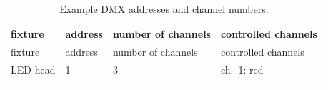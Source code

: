 \hypertarget{tbl:dmx-addresses}{}
\begin{longtable}[]{@{}llll@{}}
\caption[Example DMX addresses and channel
numbers]{\label{tbl:dmx-addresses}Example DMX addresses and channel
numbers. }\tabularnewline
\toprule
\begin{minipage}[b]{0.17\columnwidth}\raggedright\strut
fixture\strut
\end{minipage} & \begin{minipage}[b]{0.12\columnwidth}\raggedright\strut
address\strut
\end{minipage} & \begin{minipage}[b]{0.15\columnwidth}\raggedright\strut
number of channels\strut
\end{minipage} & \begin{minipage}[b]{0.28\columnwidth}\raggedright\strut
controlled channels\strut
\end{minipage}\tabularnewline
\midrule
\endfirsthead
\toprule
\begin{minipage}[b]{0.17\columnwidth}\raggedright\strut
fixture\strut
\end{minipage} & \begin{minipage}[b]{0.12\columnwidth}\raggedright\strut
address\strut
\end{minipage} & \begin{minipage}[b]{0.15\columnwidth}\raggedright\strut
number of channels\strut
\end{minipage} & \begin{minipage}[b]{0.28\columnwidth}\raggedright\strut
controlled channels\strut
\end{minipage}\tabularnewline
\midrule
\endhead
\begin{minipage}[t]{0.17\columnwidth}\raggedright\strut
LED head\strut
\end{minipage} & \begin{minipage}[t]{0.12\columnwidth}\raggedright\strut
1\strut
\end{minipage} & \begin{minipage}[t]{0.15\columnwidth}\raggedright\strut
3\strut
\end{minipage} & \begin{minipage}[t]{0.28\columnwidth}\raggedright\strut
ch.~1: red\strut
\end{minipage}\tabularnewline
\begin{minipage}[t]{0.17\columnwidth}\raggedright\strut
\strut
\end{minipage} & \begin{minipage}[t]{0.12\columnwidth}\raggedright\strut

\end{minipage}
\end{longtable}
